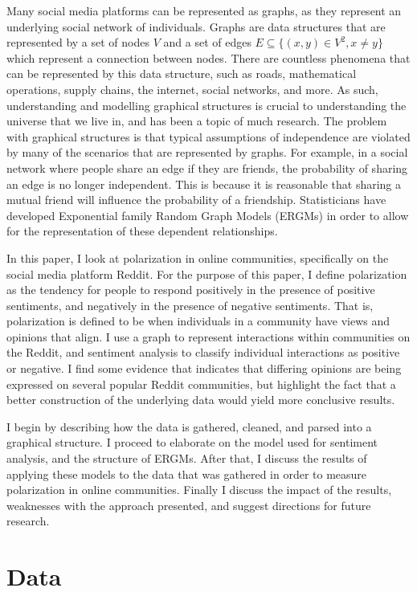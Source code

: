 \documentclass[
]{article}
\begin{document}
Many social media platforms can be represented as graphs, as they represent an underlying social network of individuals. Graphs are data structures that are represented by a set of nodes \(V\) and a set of edges \(E\subseteq\{(x,y)\in V^2,x\not=y\}\) which represent a connection between nodes. There are countless phenomena that can be represented by this data structure, such as roads, mathematical operations, supply chains, the internet, social networks, and more. As such, understanding and modelling graphical structures is crucial to understanding the universe that we live in, and has been a topic of much research. The problem with graphical structures is that typical assumptions of independence are violated by many of the scenarios that are represented by graphs. For example, in a social network where people share an edge if they are friends, the probability of sharing an edge is no longer independent. This is because it is reasonable that sharing a mutual friend will influence the probability of a friendship. Statisticians have developed Exponential family Random Graph Models (ERGMs) in order to allow for the representation of these dependent relationships.

In this paper, I look at polarization in online communities, specifically on the social media platform Reddit. For the purpose of this paper, I define polarization as the tendency for people to respond positively in the presence of positive sentiments, and negatively in the presence of negative sentiments. That is, polarization is defined to be when individuals in a community have views and opinions that align. I use a graph to represent interactions within communities on the Reddit, and sentiment analysis to classify individual interactions as positive or negative. I find some evidence that indicates that differing opinions are being expressed on several popular Reddit communities, but highlight the fact that a better construction of the underlying data would yield more conclusive results.

I begin by describing how the data is gathered, cleaned, and parsed into a graphical structure. I proceed to elaborate on the model used for sentiment analysis, and the structure of ERGMs. After that, I discuss the results of applying these models to the data that was gathered in order to measure polarization in online communities. Finally I discuss the impact of the results, weaknesses with the approach presented, and suggest directions for future research.

\hypertarget{data}{%
\section{Data}\label{data}}
\end{document}
